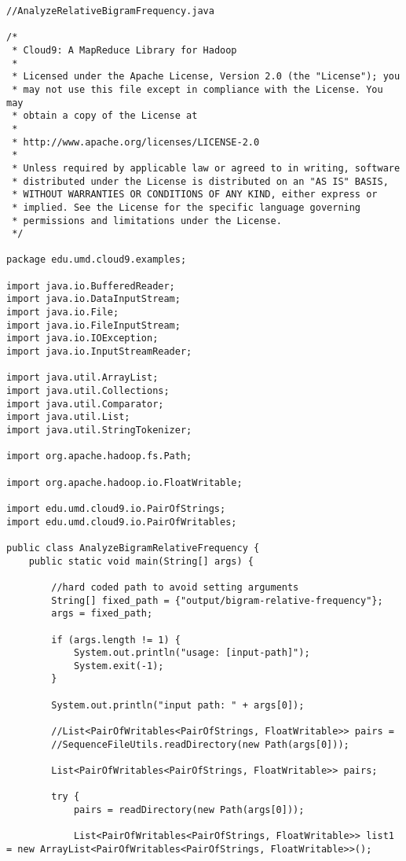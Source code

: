 \documentclass{article} %
\begin{document}
\begin{lstlisting}[style=Java]
//AnalyzeRelativeBigramFrequency.java

/*
 * Cloud9: A MapReduce Library for Hadoop
 * 
 * Licensed under the Apache License, Version 2.0 (the "License"); you
 * may not use this file except in compliance with the License. You may
 * obtain a copy of the License at
 *
 * http://www.apache.org/licenses/LICENSE-2.0
 *
 * Unless required by applicable law or agreed to in writing, software
 * distributed under the License is distributed on an "AS IS" BASIS,
 * WITHOUT WARRANTIES OR CONDITIONS OF ANY KIND, either express or
 * implied. See the License for the specific language governing
 * permissions and limitations under the License.
 */

package edu.umd.cloud9.examples;

import java.io.BufferedReader;
import java.io.DataInputStream;
import java.io.File;
import java.io.FileInputStream;
import java.io.IOException;
import java.io.InputStreamReader;

import java.util.ArrayList;
import java.util.Collections;
import java.util.Comparator;
import java.util.List;
import java.util.StringTokenizer;

import org.apache.hadoop.fs.Path;

import org.apache.hadoop.io.FloatWritable;

import edu.umd.cloud9.io.PairOfStrings;
import edu.umd.cloud9.io.PairOfWritables;

public class AnalyzeBigramRelativeFrequency {
	public static void main(String[] args) {
		
		//hard coded path to avoid setting arguments
		String[] fixed_path = {"output/bigram-relative-frequency"};
		args = fixed_path;
		
		if (args.length != 1) {
			System.out.println("usage: [input-path]");
			System.exit(-1);
		}

		System.out.println("input path: " + args[0]);

		//List<PairOfWritables<PairOfStrings, FloatWritable>> pairs =
		//SequenceFileUtils.readDirectory(new Path(args[0]));
		
		List<PairOfWritables<PairOfStrings, FloatWritable>> pairs;
		
		try {
			pairs = readDirectory(new Path(args[0]));

			List<PairOfWritables<PairOfStrings, FloatWritable>> list1 = new ArrayList<PairOfWritables<PairOfStrings, FloatWritable>>();


\end{lstlisting}
\end{document}
